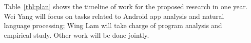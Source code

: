 Table~\ref{tbl:plan} shows the timeline of work for the proposed research in one year. Wei Yang will focus on tasks related to Android app analysis and natural language processing; Wing Lam will take charge of program analysis and empirical study. Other work will be done jointly.
